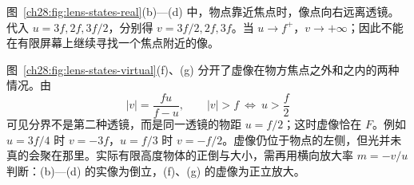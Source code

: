 图~\ref{ch28:fig:lens-states-real}(b)—(d) 中，物点靠近焦点时，像点向右远离透镜。代入 $u=3f,2f,3f/2$，分别得 $v=3f/2,2f,3f$。当 $u\to f^+$，$v\to+\infty$；因此不能在有限屏幕上继续寻找一个焦点附近的像。

\begin{center}\begin{minipage}{\linewidth}\centering
{}
\end{minipage}\end{center}

图~\ref{ch28:fig:lens-states-virtual}(f)、(g) 分开了虚像在物方焦点之外和之内的两种情况。由
\[
 |v|=\frac{fu}{f-u},\qquad
 |v|>f\ \Longleftrightarrow\ u>\frac f2
\]
可见分界不是第二种透镜，而是同一透镜的物距 $u=f/2$；这时虚像恰在 $F$。例如 $u=3f/4$ 时 $v=-3f$，$u=f/3$ 时 $v=-f/2$。虚像仍位于物点的左侧，但光并未真的会聚在那里。实际有限高度物体的正倒与大小，需再用横向放大率 $m=-v/u$ 判断：(b)—(d) 的实像为倒立，(f)、(g) 的虚像为正立放大。

